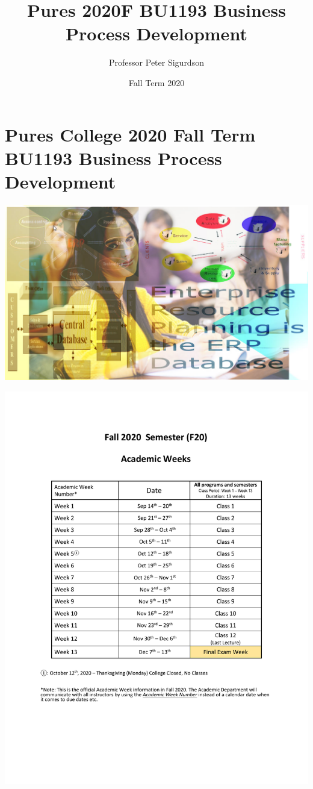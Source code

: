 \documentclass{article}
\title{Pures 2020F BU1193 Business Process Development}
\author{Professor Peter Sigurdson }
\date{Fall Term 2020}
\begin{document}
\maketitle

\section * {Pures College 2020 Fall Term BU1193 Business Process Development  }
\includegraphics[scale=0.6]{img/erp splash.jpg}






\includegraphics[]{Fall2020AcademicWeeks.pdf}
\end{document}
